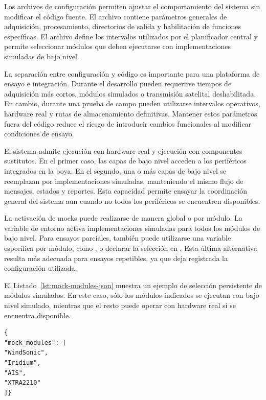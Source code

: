 Los archivos de configuración permiten ajustar el comportamiento del sistema sin modificar el código fuente. El archivo \texttt{} contiene parámetros generales de adquisición, procesamiento, directorios de salida y habilitación de funciones específicas. El archivo  define los intervalos utilizados por el planificador central y permite seleccionar módulos que deben ejecutarse con implementaciones simuladas de bajo nivel.

La separación entre configuración y código es importante para una plataforma de ensayo e integración. Durante el desarrollo pueden requerirse tiempos de adquisición más cortos, módulos simulados o transmisión satelital deshabilitada. En cambio, durante una prueba de campo pueden utilizarse intervalos operativos, hardware real y rutas de almacenamiento definitivas. Mantener estos parámetros fuera del código reduce el riesgo de introducir cambios funcionales al modificar condiciones de ensayo.

El sistema admite ejecución con hardware real y ejecución con componentes sustitutos. En el primer caso, las capas de bajo nivel acceden a los periféricos integrados en la boya. En el segundo, una o más capas de bajo nivel se reemplazan por implementaciones simuladas, manteniendo el mismo flujo de mensajes, estados y reportes. Esta capacidad permite ensayar la coordinación general del sistema aun cuando no todos los periféricos se encuentren disponibles.

La activación de mocks puede realizarse de manera global o por módulo. La variable de entorno \texttt{} activa implementaciones simuladas para todos los módulos de bajo nivel. Para ensayos parciales, también puede utilizarse una variable específica por módulo, como \texttt{}, o declarar la selección en \texttt{}. Esta última alternativa resulta más adecuada para ensayos repetibles, ya que deja registrada la configuración utilizada.

El Listado~\ref{lst:mock-modules-json} muestra un ejemplo de selección persistente de módulos simulados. En este caso, sólo los módulos indicados se ejecutan con bajo nivel simulado, mientras que el resto puede operar con hardware real si se encuentra disponible.

\begin{lstlisting}[style=pseudocodigo, caption={Ejemplo de selección de módulos simulados en \texttt{configs/mock\_modules.json}.}, label={lst:mock-modules-json}]
{
"mock_modules": [
"WindSonic",
"Iridium",
"AIS",
"XTRA2210"
]}
\end{lstlisting}

